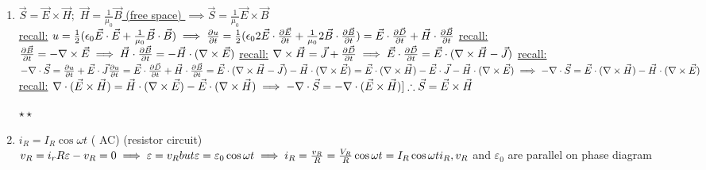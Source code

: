 \documentclass[12pt]{amsart}
\begin{document}
\begin{enumerate}
\item \underline{$\vec{S} = \vec{E} \times \vec{H};\,\, \vec{H} = \frac{1}{\mu_0} \vec{B}$ (free space) $\implies \vec{S} = \frac{1}{\mu_0} \vec{E} \times \vec{B}$}\\
\underline{recall:} $u = \frac{1}{2} (\epsilon_0 \vec{E} \cdot \vec{E} + \frac{1}{\mu_0} \vec{B} \cdot \vec{B})\\
\implies \frac{\partial u}{\partial t} = \frac{1}{2}(\epsilon_0 2 \vec{E} \cdot \frac{\partial \vec{E}}{\partial t} + \frac{1}{\mu_0} 2 \vec{B} \cdot \frac{\partial \vec{B}}{\partial t})\\
= \vec{E} \cdot \frac{\partial \vec{D}}{\partial t} + \vec{H} \cdot \frac{\partial \vec{B}}{\partial t}\\$
\underline{recall:}$ \frac{\partial \vec{B}}{\partial t} = - \nabla \times \vec{E} \implies \vec{H} \cdot \frac{\partial \vec{B}}{\partial t} = - \vec{H} \cdot ( \nabla \times \vec{E})\\$
\underline{recall:} $\nabla \times \vec{H} = \vec{J} + \frac{\partial \vec{D}}{\partial t} \implies \vec{E} \cdot \frac{\partial \vec{D}}{\partial t} = \vec{E} \cdot ( \nabla \times \vec{H} - \vec{J})\\$
\underline{recall:} $- \nabla \cdot \vec{S} = \frac{\partial u}{\partial t} + \vec{E} \cdot \vec{J}\\
\frac{\partial u}{\partial t} = \vec{E} \cdot \frac{\partial \vec{D}}{\partial t} + \vec{H} \cdot \frac{\partial \vec{B}}{\partial t}\\
= \vec{E} \cdot (\nabla \times \vec{H} - \vec{J}) - \vec{H} \cdot ( \nabla \times \vec{E})\\
= \vec{E} \cdot (\nabla \times \vec{H}) - \vec{E} \cdot \vec{J} - \vec{H} \cdot (\nabla \times \vec{E})\\
\implies - \nabla \cdot \vec{S} = \vec{E} \cdot(\nabla \times \vec{H}) - \vec{H} \cdot (\nabla \times \vec{E})\\$
\underline{recall:} $\nabla \cdot (\vec{E} \times \vec{H}) = \vec{H} \cdot (\nabla \times \vec{E}) - \vec{E} \cdot (\nabla \times \vec{H})\\
\implies - \nabla \cdot \vec{S} = - \nabla \cdot (\vec{E} \times \vec{H})]\\
\therefore \vec{S} = \vec{E} \times \vec{H}$\\


\hdashrule[0.5ex][c]{\linewidth}{0.5pt}{1.5mm}

$\star \star$\\
\item \underline{$i_R = I_R \cos \omega t $} ( AC) (resistor circuit)\\
$v_R = i_r R\\
\varepsilon - v_R = 0\\
\implies \varepsilon = v_R but \varepsilon = \varepsilon_0 \cos \omega t\\
\implies i_R = \frac{v_R}{R} = \frac{V_R}{R} \cos \omega t = I_R \cos \omega t\\
i_R, v_R$ and $\varepsilon_0$ are parallel on phase diagram



\end{enumerate}
\end{document}
